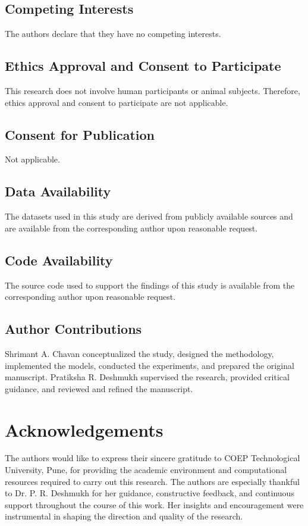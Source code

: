 \documentclass[sn-nature]{sn-jnl}
\begin{document}
\subsection*{Competing Interests}
The authors declare that they have no competing interests.

\subsection*{Ethics Approval and Consent to Participate}
This research does not involve human participants or animal subjects. Therefore, ethics approval and consent to participate are not applicable.

\subsection*{Consent for Publication}
Not applicable.

\subsection*{Data Availability}
The datasets used in this study are derived from publicly available sources and are available from the corresponding author upon reasonable request.

\subsection*{Code Availability}
The source code used to support the findings of this study is available from the corresponding author upon reasonable request.

\subsection*{Author Contributions}
Shrimant A. Chavan conceptualized the study, designed the methodology, implemented the models, conducted the experiments, and prepared the original manuscript.  
Pratiksha R. Deshmukh supervised the research, provided critical guidance, and reviewed and refined the manuscript.

\section*{Acknowledgements}
The authors would like to express their sincere gratitude to COEP Technological University, Pune, for providing the academic environment and computational resources required to carry out this research. The authors are especially thankful to Dr. P. R. Deshmukh for her guidance, constructive feedback, and continuous support throughout the course of this work. Her insights and encouragement were instrumental in shaping the direction and quality of the research.


\end{document}
